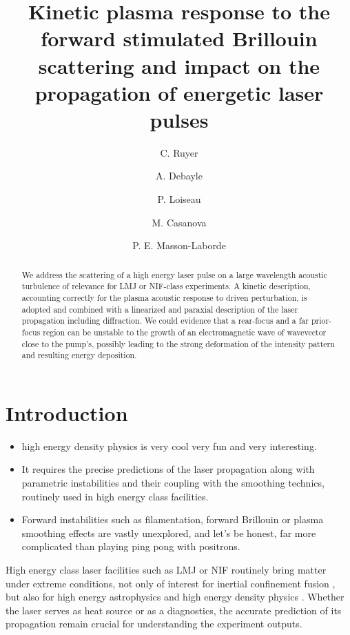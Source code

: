 \documentclass[
 reprint,
 amsmath,amssymb,
 aps,
]{revtex4-1}
\begin{document}
\title{Kinetic plasma response to the forward stimulated Brillouin scattering and impact on  the propagation of  energetic laser pulses}
\author{C. Ruyer}
\author{A. Debayle}
\author{P. Loiseau}
\author{M. Casanova}
\author{P. E. Masson-Laborde}

\begin{abstract}
We address the scattering of a high energy laser pulse on a   large wavelength acoustic turbulence of relevance for LMJ or NIF-class  experiments. A kinetic description, accounting correctly for the plasma acoustic  response to driven perturbation, is adopted and combined with a linearized and paraxial  description of the laser propagation including diffraction. We could evidence that a rear-focus and  a far prior-focus region   can be unstable to the growth of an electromagnetic wave of wavevector close to the pump's, possibly leading to the strong deformation of the intensity pattern and resulting energy deposition. 
\end{abstract}

\maketitle

\section{Introduction}
\begin{itemize}
    \item high energy density physics is very cool very  fun and very interesting.
    \item It requires the precise predictions of the  laser propagation  along with parametric instabilities and their coupling with the smoothing technics, routinely used in high energy class facilities.  
    \item Forward instabilities such as filamentation, forward Brillouin  or plasma smoothing effects \cite[]{ POP_Grech_2006,PRL_Grech_2009} are vastly unexplored, and let's be honest, far more complicated than playing ping pong with positrons.
\end{itemize}

High energy class laser facilities such as LMJ or  NIF \cite[]{}  routinely bring matter under extreme conditions, not only of interest for inertial confinement fusion \cite{Lindl_2004,He_2007,Cavailler_2005}, but also for high energy astrophysics \cite{Drake_2012} and high energy density physics   \cite{Drake2006}. 
Whether  the laser   serves as heat source or as a diagnostics, the accurate prediction of its propagation remain crucial for understanding  the experiment outputs. 
\end{document}
